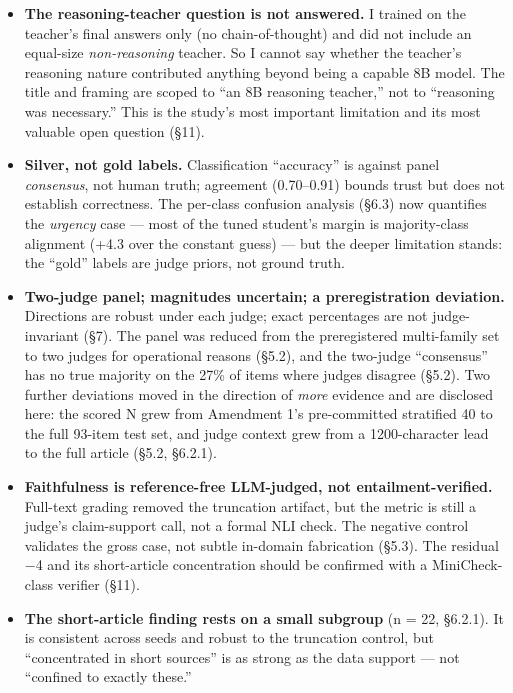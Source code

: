 \documentclass[11pt]{article}
\providecommand{\tightlist}{\setlength{\itemsep}{0pt}\setlength{\parskip}{0pt}}
\providecommand{\tightlist}{%
  \setlength{\itemsep}{0pt}\setlength{\parskip}{0pt}}
\begin{document}
\begin{itemize}
\tightlist
\item
  \textbf{The reasoning-teacher question is not answered.} I trained on
  the teacher's final answers only (no chain-of-thought) and did not
  include an equal-size \emph{non-reasoning} teacher. So I cannot say
  whether the teacher's reasoning nature contributed anything beyond
  being a capable 8B model. The title and framing are scoped to ``an 8B
  reasoning teacher,'' not to ``reasoning was necessary.'' This is the
  study's most important limitation and its most valuable open question
  (§11).
\item
  \textbf{Silver, not gold labels.} Classification ``accuracy'' is
  against panel \emph{consensus}, not human truth; agreement
  (0.70--0.91) bounds trust but does not establish correctness. The
  per-class confusion analysis (§6.3) now quantifies the \emph{urgency}
  case --- most of the tuned student's margin is majority-class
  alignment (+4.3 over the constant guess) --- but the deeper limitation
  stands: the ``gold'' labels are judge priors, not ground truth.
\item
  \textbf{Two-judge panel; magnitudes uncertain; a preregistration
  deviation.} Directions are robust under each judge; exact percentages
  are not judge-invariant (§7). The panel was reduced from the
  preregistered multi-family set to two judges for operational reasons
  (§5.2), and the two-judge ``consensus'' has no true majority on the
  27\% of items where judges disagree (§5.2). Two further deviations
  moved in the direction of \emph{more} evidence and are disclosed here:
  the scored N grew from Amendment 1's pre-committed stratified 40 to
  the full 93-item test set, and judge context grew from a
  1200-character lead to the full article (§5.2, §6.2.1).
\item
  \textbf{Faithfulness is reference-free LLM-judged, not
  entailment-verified.} Full-text grading removed the truncation
  artifact, but the metric is still a judge's claim-support call, not a
  formal NLI check. The negative control validates the gross case, not
  subtle in-domain fabrication (§5.3). The residual −4 and its
  short-article concentration should be confirmed with a MiniCheck-class
  verifier (§11).
\item
  \textbf{The short-article finding rests on a small subgroup} (n = 22,
  §6.2.1). It is consistent across seeds and robust to the truncation
  control, but ``concentrated in short sources'' is as strong as the
  data support --- not ``confined to exactly these.''

\end{itemize}
\end{document}
